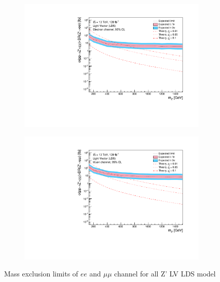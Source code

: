 \documentclass[12pt, a4paper]{book}
\begin{document}
\begin{figure}[!ht]
	\centering
   \begin{subfigure}[b]{0.49\textwidth}
      \centering
      \includegraphics[width=1\textwidth]{Limits/LV_LDS/mass_exclusion_ee.pdf}
      \end{subfigure}
   \hfill
   \begin{subfigure}[b]{0.49\textwidth}
      \centering
      \includegraphics[width=1\textwidth]{Limits/LV_LDS/mass_exclusion_uu.pdf}
      \end{subfigure}
   \caption{Mass exclusion limits of $ee$ and $\mu\mu$ channel for all Z' LV LDS model}\label{fig:LV_LDS_exclusion_ee_uu}
\end{figure}
\clearpage
\end{document}
